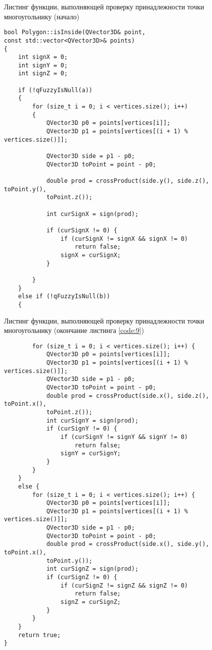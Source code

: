\begin{code}
\caption{Листинг функции, выполняющей проверку принадлежности точки многоугольнику (начало)}
\label{code:9}
\begin{verbatim}
bool Polygon::isInside(QVector3D& point, 
const std::vector<QVector3D>& points)
{
    int signX = 0;
    int signY = 0;
    int signZ = 0;

    if (!qFuzzyIsNull(a))
    {
        for (size_t i = 0; i < vertices.size(); i++)
        {
            QVector3D p0 = points[vertices[i]];
            QVector3D p1 = points[vertices[(i + 1) % vertices.size()]];

            QVector3D side = p1 - p0;
            QVector3D toPoint = point - p0;

            double prod = crossProduct(side.y(), side.z(), toPoint.y(), 
            toPoint.z());

            int curSignX = sign(prod);

            if (curSignX != 0) {
                if (curSignX != signX && signX != 0)
                    return false;
                signX = curSignX;
            }

        }
    }
    else if (!qFuzzyIsNull(b))
    {
\end{verbatim}
\end{code}

\begin{code}
\caption{Листинг функции, выполняющей проверку принадлежности точки многоугольнику (окончание листинга \ref{code:9})}
\label{code:10}
\begin{verbatim}
        for (size_t i = 0; i < vertices.size(); i++) {
            QVector3D p0 = points[vertices[i]];
            QVector3D p1 = points[vertices[(i + 1) % vertices.size()]];
            QVector3D side = p1 - p0;
            QVector3D toPoint = point - p0;
            double prod = crossProduct(side.x(), side.z(), toPoint.x(), 
            toPoint.z());
            int curSignY = sign(prod);
            if (curSignY != 0) {
                if (curSignY != signY && signY != 0)
                    return false;
                signY = curSignY;
            }
        }
    }
    else {
        for (size_t i = 0; i < vertices.size(); i++) {
            QVector3D p0 = points[vertices[i]];
            QVector3D p1 = points[vertices[(i + 1) % vertices.size()]];
            QVector3D side = p1 - p0;
            QVector3D toPoint = point - p0;
            double prod = crossProduct(side.x(), side.y(), toPoint.x(), 
            toPoint.y());
            int curSignZ = sign(prod);
            if (curSignZ != 0) {
                if (curSignZ != signZ && signZ != 0)
                    return false;
                signZ = curSignZ;
            }
        }
    }
    return true;
}
\end{verbatim}
\end{code}

